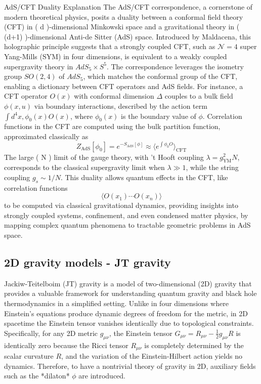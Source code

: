 AdS/CFT Duality Explanation
The AdS/CFT correspondence, a cornerstone of modern theoretical physics, posits a duality between a conformal field theory (CFT) in ( d )-dimensional Minkowski space and a gravitational theory in ( (d+1) )-dimensional Anti-de Sitter (AdS) space. Introduced by Maldacena, this holographic principle suggests that a strongly coupled CFT, such as \( \mathcal{N}=4 \) super Yang-Mills (SYM) in four dimensions, is equivalent to a weakly coupled supergravity theory in \( AdS_5 \times S^5 \). The correspondence leverages the isometry group \( SO(2,4) \) of \( AdS_5 \), which matches the conformal group of the CFT, enabling a dictionary between CFT operators and AdS fields. For instance, a CFT operator \( O(x) \) with conformal dimension \( \Delta \) couples to a bulk field \( \phi(x, u) \) via boundary interactions, described by the action term \( \int d^4 x , \phi_0(x) O(x) \), where \( \phi_0(x) \) is the boundary value of \( \phi \). Correlation functions in the CFT are computed using the bulk partition function, approximated classically as \[Z_{\text{AdS}}[\phi_0] = e^{-S_{\text{AdS}}[\phi]} \approx \langle e^{\int \phi_0 O} \rangle_{\text{CFT}}\] The large ( N ) limit of the gauge theory, with ’t Hooft coupling \( \lambda = g_{\text{YM}}^2 N \), corresponds to the classical supergravity limit when \( \lambda \gg 1 \), while the string coupling \( g_s \sim 1/N \). This duality allows quantum effects in the CFT, like correlation functions \[\langle O(x_1) \cdots O(x_n) \rangle\] to be computed via classical gravitational dynamics, providing insights into strongly coupled systems, confinement, and even condensed matter physics, by mapping complex quantum phenomena to tractable geometric problems in AdS space.


\subsection{2D gravity models - JT gravity}
Jackiw-Teitelboim (JT) gravity is a model of two-dimensional (2D) gravity that provides a valuable framework for understanding quantum gravity and black hole thermodynamics in a simplified setting. Unlike in four dimensions where Einstein's equations produce dynamic degrees of freedom for the metric, in 2D spacetime the Einstein tensor vanishes identically due to topological constraints. Specifically, for any 2D metric $g_{\mu\nu}$, the Einstein tensor $G_{\mu\nu} = R_{\mu\nu} - \frac{1}{2}g_{\mu\nu}R$ is identically zero because the Ricci tensor $R_{\mu\nu}$ is completely determined by the scalar curvature $R$, and the variation of the Einstein-Hilbert action yields no dynamics. Therefore, to have a nontrivial theory of gravity in 2D, auxiliary fields such as the *dilaton* $\phi$ are introduced.

